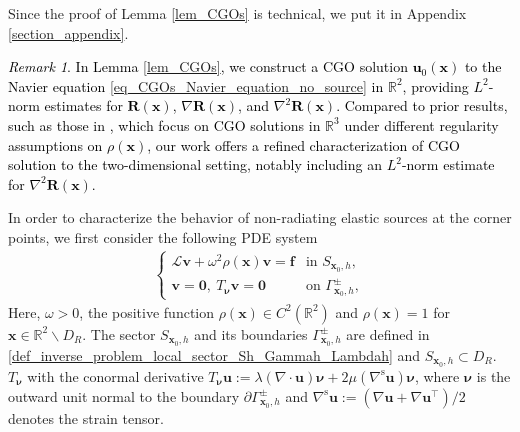 \documentclass[11pt,reqno,oneside]{amsart}
\theoremstyle{definition}
\theoremstyle{remark}
\newtheorem{remark}{Remark}[section]
\numberwithin{equation}{section}
\numberwithin{equation}{section}
\theoremstyle{remark}
\begin{document}
Since the proof of Lemma \ref{lem_CGOs} is technical, we put it in Appendix \ref{section_appendix}.

\textcolor{black}{\begin{remark}
		In Lemma \ref{lem_CGOs}, we construct a CGO solution \(\mathbf{u}_0(\mathbf{x})\) to the Navier equation \eqref{eq_CGOs_Navier_equation_no_source} in $\mathbb R^2$, providing \( L^2 \)-norm estimates for \(\mathbf{R}(\mathbf{x})\), \(\nabla \mathbf{R}(\mathbf{x})\), and \(\nabla^2 \mathbf{R}(\mathbf{x})\). Compared to prior results, such as those in \cite{barcelo2018uniqueness, hahner2002uniqueness}, which focus on CGO solutions in $\mathbb R^3$ under different regularity assumptions on \(\rho(\mathbf{x})\), our work offers a refined characterization of CGO solution to the two-dimensional setting, notably including an $L^2$-norm estimate for $\nabla^2\mathbf{R}\left(\mathbf{x}\right)$.
\end{remark}}


In order to characterize the behavior of non-radiating elastic sources at the corner points, we first consider the following PDE system
\begin{align} \label{model_part_v_Sh}
	\begin{cases}
		\mathcal{L} \mathbf{v} + \omega^2 \rho\left(\mathbf{x}\right) \mathbf{v} = \mathbf{f} & \text{in } S_{\mathbf{x}_0,h} , \\
		\mathbf{v} = \bm{0}, \ T_{\bm{\nu}} \mathbf{v} = \bm{0} & \text {on } \Gamma_{\mathbf{x}_0,h}^\pm,
	\end{cases}
\end{align}
Here, $ \omega>0 $, the positive function $ \rho\left(\mathbf{x}\right)\in C^2\left(\mathbb{R}^2\right) $ and $ \rho\left(\mathbf{x}\right)=1 $ for $ \mathbf{x}\in\mathbb{R}^2 \backslash D_R $. The sector $ S_{\mathbf{x}_0,h} $ and its boundaries $ \Gamma_{\mathbf{x}_0,h}^\pm $ are defined in \eqref{def_inverse_problem_local_sector_Sh_Gammah_Lambdah} and $ S_{\mathbf{x}_0,h}\subset D_R $.  $ T_{\bm{\nu}} $ with the conormal derivative $ T_{\bm{\nu}}\mathbf{u} := \lambda\left(\nabla\cdot\mathbf{u}\right)\bm{\nu} + 2\mu\left(\nabla^{\text{s}}\mathbf{u}\right)\bm{\nu} $, where $ \bm{\nu} $ is the outward unit normal to the boundary $ \partial \Gamma^\pm_{\mathbf x_0,h} $ and  $ \nabla^{\text{s}}\mathbf{u} := \left(\nabla\mathbf{u}+\nabla\mathbf{u}^{\top}\right)/2 $ denotes the strain tensor.
\end{document}
